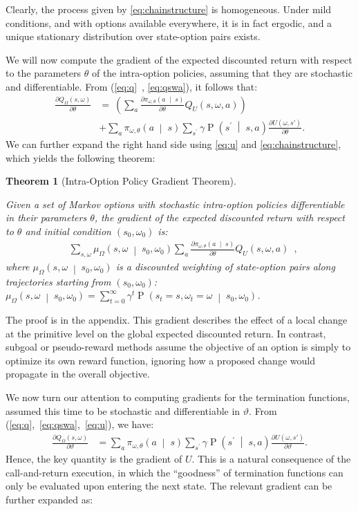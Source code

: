 \documentclass[letterpaper]{article}
\def\given{\;\middle\vert\;}
\DeclareMathOperator{\prob}{P}
\def\defeq{=}\newcommand{\deriv}[2][]{\frac{\partial#1}{\partial#2}}
\newtheorem{theorem}{Theorem}
\def\termparams{\vartheta}
\begin{document}
Clearly, the process given by \eqref{eq:chainstructure} is homogeneous. Under mild conditions,
and with options available everywhere, it is in fact ergodic, and a unique stationary
distribution over state-option pairs exists.

We will now compute the gradient of the expected discounted return with respect to
the parameters $\theta$ of the intra-option policies, assuming that they are stochastic
and differentiable.
From (\ref{eq:q}~, \ref{eq:qswa}), it follows that:
\begin{align*}
\deriv[Q_\Omega(s, \omega)]{\theta} &= \
\left(\sum_a \deriv[\pi_{\omega,\theta}\left( a \given s \right)]{\theta}  Q_U(s,\omega, a) \right) \\
&+ \sum_a \pi_{\omega,\theta}\left(a \given s\right)  \sum_{s^\prime} \gamma \prob\left( s^\prime \given s, a\right) \deriv[U(\omega, s')]{\theta}  .
\end{align*}
We can further expand the right hand side using
\eqref{eq:u} and \eqref{eq:chainstructure}, which yields the following theorem:


\begin{theorem}[Intra-Option Policy Gradient Theorem]\label{thm:intrapg}

Given a set of Markov options with stochastic intra-option policies differentiable
in their parameters $\theta$, the gradient of the expected discounted return
with respect to $\theta$ and initial condition $(s_0,\omega_0)$ is:
\begin{align*}
&\sum_{s, \omega} \mu_\Omega\left(s, \omega  \given s_0, \omega_0\right) \sum_a \deriv[\pi_{\omega,\theta}\left( a \given s \right)]{\theta} Q_U(s,\omega, a)\enspace ,
\end{align*}
where $\mu_\Omega\left(s, \omega \given s_0, \omega_0\right)$ is a discounted
weighting of state-option pairs along  trajectories starting from $(s_0, \omega_0)$:
$\mu_\Omega\left(s, \omega \given s_0, \omega_0\right) \defeq \sum_{t=0}^\infty \gamma^t \prob\left( s_t = s, \omega_t = \omega \given s_0, \omega_0 \right)$.
\end{theorem}
The proof is in the appendix.
This gradient describes the effect of a local change at the
primitive level on the global expected discounted return. In contrast, subgoal
or pseudo-reward methods assume the objective of an option is simply to optimize its
own reward function, ignoring how a proposed change would propagate
in the overall objective.

We now turn our attention to  computing gradients for the
termination functions, assumed this time to be stochastic and differentiable in
$\termparams$. From (\ref{eq:q},~\ref{eq:qswa},~\ref{eq:u}), we have:
\begin{align*}
\deriv[Q_\Omega(s, \omega)]{\vartheta} &= \sum_a \pi_{\omega,\theta}\left(a \given s\right)  \sum_{s^\prime} \gamma \prob\left( s^\prime \given s, a\right) \deriv[U(\omega, s')]{\vartheta} .
\end{align*}
Hence, the key quantity is the gradient of $U$. This is a natural consequence of the
call-and-return execution,  in which the ``goodness'' of
termination functions can only be evaluated  upon entering the next state.
The relevant gradient can be further expanded as:
\end{document}
